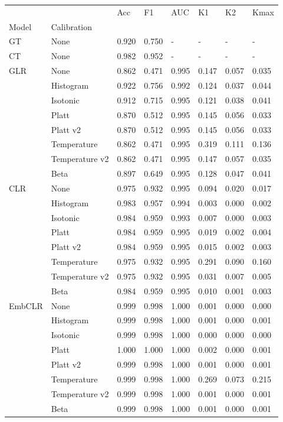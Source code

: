 \begin{tabular}{llllllll}
\toprule
 &  & Acc & F1 & AUC & K1 & K2 & Kmax \\
Model & Calibration &  &  &  &  &  &  \\
\midrule
GT & None & 0.920 & 0.750 & - & - & - & - \\
\cline{1-8}
CT & None & 0.982 & 0.952 & - & - & - & - \\
\cline{1-8}
\multirow[t]{8}{*}{GLR} & None & 0.862 & 0.471 & 0.995 & 0.147 & 0.057 & 0.035 \\
 & Histogram & 0.922 & 0.756 & 0.992 & 0.124 & 0.037 & 0.044 \\
 & Isotonic & 0.912 & 0.715 & 0.995 & 0.121 & 0.038 & 0.041 \\
 & Platt & 0.870 & 0.512 & 0.995 & 0.145 & 0.056 & 0.033 \\
 & Platt v2 & 0.870 & 0.512 & 0.995 & 0.145 & 0.056 & 0.033 \\
 & Temperature & 0.862 & 0.471 & 0.995 & 0.319 & 0.111 & 0.136 \\
 & Temperature v2 & 0.862 & 0.471 & 0.995 & 0.147 & 0.057 & 0.035 \\
 & Beta & 0.897 & 0.649 & 0.995 & 0.128 & 0.047 & 0.041 \\
\cline{1-8}
\multirow[t]{8}{*}{CLR} & None & 0.975 & 0.932 & 0.995 & 0.094 & 0.020 & 0.017 \\
 & Histogram & 0.983 & 0.957 & 0.994 & 0.003 & 0.000 & 0.002 \\
 & Isotonic & 0.984 & 0.959 & 0.993 & 0.007 & 0.000 & 0.003 \\
 & Platt & 0.984 & 0.959 & 0.995 & 0.019 & 0.002 & 0.004 \\
 & Platt v2 & 0.984 & 0.959 & 0.995 & 0.015 & 0.002 & 0.003 \\
 & Temperature & 0.975 & 0.932 & 0.995 & 0.291 & 0.090 & 0.160 \\
 & Temperature v2 & 0.975 & 0.932 & 0.995 & 0.031 & 0.007 & 0.005 \\
 & Beta & 0.984 & 0.959 & 0.995 & 0.010 & 0.001 & 0.003 \\
\cline{1-8}
\multirow[t]{8}{*}{EmbCLR} & None & 0.999 & 0.998 & 1.000 & 0.001 & 0.000 & 0.000 \\
 & Histogram & 0.999 & 0.998 & 1.000 & 0.001 & 0.000 & 0.001 \\
 & Isotonic & 0.999 & 0.998 & 1.000 & 0.000 & 0.000 & 0.000 \\
 & Platt & 1.000 & 1.000 & 1.000 & 0.002 & 0.000 & 0.001 \\
 & Platt v2 & 0.999 & 0.998 & 1.000 & 0.001 & 0.000 & 0.001 \\
 & Temperature & 0.999 & 0.998 & 1.000 & 0.269 & 0.073 & 0.215 \\
 & Temperature v2 & 0.999 & 0.998 & 1.000 & 0.001 & 0.000 & 0.001 \\
 & Beta & 0.999 & 0.998 & 1.000 & 0.001 & 0.000 & 0.001 \\
\cline{1-8}
\bottomrule
\end{tabular}
